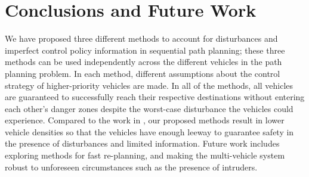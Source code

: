 \section{Conclusions and Future Work}
We have proposed three different methods to account for disturbances and imperfect control policy information in sequential path planning; these three methods can be used independently across the different vehicles in the path planning problem. In each method, different assumptions about the control strategy of higher-priority vehicles are made. In all of the methods, all vehicles are guaranteed to successfully reach their respective destinations without entering each other's danger zones despite the worst-case disturbance the vehicles could experience. Compared to the work in \cite{Chen15}, our proposed methods result in lower vehicle densities so that the vehicles have enough leeway to guarantee safety in the presence of disturbances and limited information. Future work includes exploring methods for fast re-planning, and making the multi-vehicle system robust to unforeseen circumstances such as the presence of intruders.